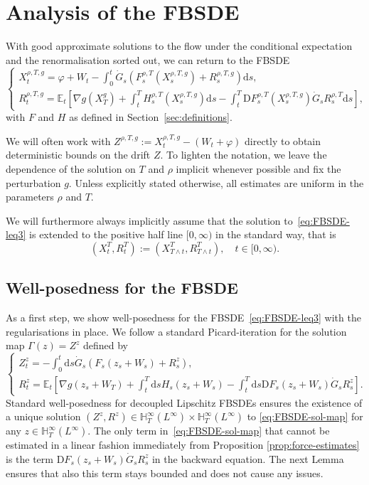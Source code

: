 \documentclass[11pt, a4paper]{scrartcl}
\numberwithin{equation}{section}
\theoremstyle{plain}
\theoremstyle{remark}
\newcommand{\assign}{:=}
\newcommand{\mathD}{\mathrm{D}}
\newcommand{\mathd}{\mathrm{d}}
\begin{document}
\section{ Analysis of the FBSDE}\label{sec:FBSDE}

With good approximate solutions to the flow under the conditional expectation
and the renormalisation sorted out, we can return to the FBSDE
\begin{equation}
  \begin{cases}
    X_t^{\rho, T, g} = \varphi + W_t - \int_0^t \dot{G}_s (F^{\rho, T}_s
    (X_s^{\rho, T, g}) + R_s^{\rho, T, g}) \mathd s,\\
    R^{\rho, T, g}_t =\mathbb{E}_t \left[ \nabla g (X_T^g) + \int_t^T H^{\rho,
    T}_s (X_s^{\rho, T, g}) \mathd s - \int_t^T \mathD F^{\rho, T}_s
    (X_s^{\rho, T, g})  \dot{G}_s R_s^{\rho, T} \mathd s \right],
  \end{cases} \label{eq:FBSDE-leq3}
\end{equation}
with $F$ and $H$ as defined in Section~\ref{sec:definitions}.

We will often work with $Z^{\rho, T, g} \assign X_t^{\rho, T, g} - (W_t +
\varphi)$ directly to obtain deterministic bounds on the drift $Z$. To lighten
the notation, we leave the dependence of the solution on $T$ and $\rho$
implicit whenever possible and fix the perturbation $g$. Unless
explicitly stated otherwise, all estimates are uniform in the parameters
$\rho$ and $T$.

We will furthermore always implicitly assume that the solution
to~\eqref{eq:FBSDE-leq3} is extended to the positive half line $[0, \infty)$
in the standard way, that is
\[ (X_t^T, R_t^T) \assign (X_{T \wedge t}^T, R_{T \wedge t}^T), \quad t \in
   [0, \infty) . \]
\subsection{Well-posedness for the FBSDE}

As a first step, we show well-posedness for the FBSDE~\eqref{eq:FBSDE-leq3}
with the regularisations in place. We follow a standard Picard-iteration for
the solution map $\Gamma (z) = Z^z$ defined by
\begin{equation}
  \begin{cases}
    Z^z_t = -\int_0^t \mathd s \dot{G}_s (F_s (z_s + W_s) + R^z_s),\\
    R^z_t =\mathbb{E}_t \left[ \nabla g (z_s + W_T) + \int_t^T \mathd s H_s
    (z_s + W_s) - \int_t^T \mathd s \mathD F_s (z_s + W_s)  \dot{G}_s R^z_s
    \right] .
  \end{cases} \label{eq:FBSDE-sol-map}
\end{equation}
Standard well-posedness for decoupled Lipschitz FBSDEs ensures the existence
of a unique solution $(Z^z, R^z) \in \mathbb{H}^{\infty}_T (L^{\infty}) \times
\mathbb{H}^{\infty}_T (L^{\infty})$ to \eqref{eq:FBSDE-sol-map} for any $z \in
\mathbb{H}^{\infty}_T (L^{\infty})$. The only term in~\eqref{eq:FBSDE-sol-map}
that cannot be estimated in a linear fashion immediately from Proposition
\ref{prop:force-estimates} is the term $\mathD F_s (z_s + W_s)  \dot{G}_s R^z_s$
in the backward equation. The next Lemma ensures that also this term stays
bounded and does not cause any issues.
\end{document}
